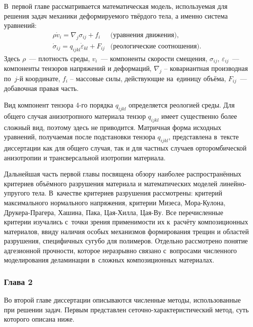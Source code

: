 \documentclass[a4paper,14pt]{extarticle}
\numberwithin{equation}{section}
\begin{document}
        В~первой главе рассматривается математическая модель, используемая для решения задач механики деформируемого
        твёрдого тела, а именно система уравнений:
        \begin{eqnarray*}
            \rho\dot{v}_i=\nabla_j\sigma_{ij}+f_i             & \textrm{(уравнения движения),} \\
            \dot\sigma_{ij}=q_{ijkl}\dot{\varepsilon}_{kl}+F_{ij} & \textrm{(реологические соотношения).}
        \end{eqnarray*}
        Здесь $\rho$~--- плотность среды, $v_i$~--- компоненты скорости смещения,
        $\sigma_{ij}$, $\varepsilon_{ij}$~--- компоненты тензоров напряжений и деформаций,
        $\nabla_j$ – ковариантная производная по~$j$-й координате, $f_i$ – массовые
        силы, действующие на~единицу объёма, $F_{ij}$~--- добавочная правая часть.


        Вид компонент тензора 4-го порядка $q_{ijkl}$ определяется реологией среды. Для общего случая анизотропного
        материала тензор $q_{ijkl}$ имеет существенно более сложный вид, поэтому здесь не приводится. Матричная форма
        исходных уравнений, получаемая после подстановки тензора $q_{ijkl}$, представлена в~тексте диссертации как для
        общего случая, так и для частных случаев орторомбической анизотропии и трансверсальной изотропии материала.

        Дальнейшая часть первой главы посвящена обзору наиболее распространённых критериев объёмного разрушения
        материала и математических моделей линейно-упругого тела. В~качестве критериев разрушения рассмотрены: критерий
        максимального нормального напряжения, критерии Мизеса, Мора-Кулона, Друкера-Прагера, Хашина,  Пака,  Цая-Хилла,
        Цая-Ву. Все перечисленные критерии изучались с~точки зрения применимости их к~расчёту композиционных материалов,
        ввиду наличия особых механизмов формирования трещин и областей разрушения, специфичных сугубо для полимеров.
        Отдельно рассмотрено понятие адгезионной прочности, которое неразрывно связано с~вопросами численного
        моделирования деламинации в~сложных композиционных материалах.


        \subsubsection*{Глава 2}

        Во второй главе диссертации описываются численные методы, использованные при решении задач. Первым представлен
        сеточно-ха\-рак\-те\-рис\-ти\-чес\-кий метод, суть которого описана ниже.
\end{document}
